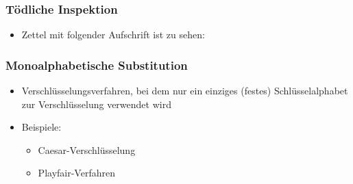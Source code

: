 \begin{frame}
\frametitle{Tödliche Inspektion}
\begin{itemize}
	\item Zettel mit folgender Aufschrift ist zu sehen:
\end{itemize}
\begin{figure}[ht]
	\centering
\end{figure}
\end{frame}

\begin{frame}
\frametitle{Monoalphabetische Substitution}
\begin{itemize}
	\item Verschlüsselungsverfahren, bei dem nur ein einziges (festes) Schlüsselalphabet zur Verschlüsselung verwendet wird
	\item Beispiele:
	\begin{itemize}
		\item Caesar-Verschlüsselung
		\item Playfair-Verfahren
	\end{itemize}
\end{itemize}
\end{frame}


